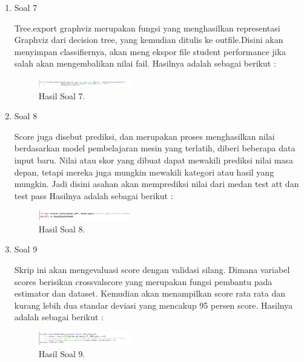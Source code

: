 \begin{enumerate}
	\item Soal 7
	\hfill\break
	
	Tree.export graphviz merupakan fungsi yang menghasilkan representasi Graphviz dari decision tree, yang kemudian ditulis ke outfile.Disini akan menyimpan classifiernya, akan meng ekspor file student performance jika salah akan mengembalikan nilai fail. Hasilnya adalah sebagai berikut :
	\begin{figure}[H]
	\centering
		\includegraphics[width=4cm]{figures/1174021/tugas2/materi/hasil7.PNG}
		\caption{Hasil Soal 7.}
	\end{figure}

	\item Soal 8
	\hfill\break
	
	Score juga disebut prediksi, dan merupakan proses menghasilkan nilai berdasarkan model pembelajaran mesin yang terlatih, diberi beberapa data input baru. Nilai atau skor yang dibuat dapat mewakili prediksi nilai masa depan, tetapi mereka juga mungkin mewakili kategori atau hasil yang mungkin. Jadi disini asahan akan memprediksi nilai dari medan test att dan test pass Hasilnya adalah sebagai berikut :
	\begin{figure}[H]
	\centering
		\includegraphics[width=4cm]{figures/1174021/tugas2/materi/hasil8.PNG}
		\caption{Hasil Soal 8.}
	\end{figure}

	\item Soal 9
	\hfill\break
	
	Skrip ini akan mengevaluasi score dengan validasi silang. Dimana variabel scores berisikan crossvalscore yang merupakan fungsi pembantu pada estimator dan dataset. Kemudian akan menampilkan score rata rata dan kurang lebih dua standar deviasi yang mencakup 95 persen score. Hasilnya adalah sebagai berikut :
	\begin{figure}[H]
	\centering
		\includegraphics[width=4cm]{figures/1174021/tugas2/materi/hasil9.PNG}
		\caption{Hasil Soal 9.}
	\end{figure}


\end{enumerate}
